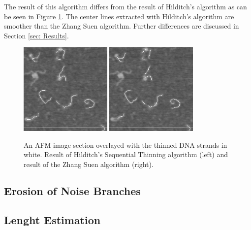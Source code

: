 \documentclass{article}
\begin{document}
The result of this algorithm differs from the result of Hilditch's algorithm as can be seen in Figure \ref{fig: thinnedHilditchZhang}. The center lines extracted with Hilditch's algorithm are smoother than the Zhang Suen algorithm. Further differences are discussed in Section \ref{sec: Results}.
\begin{figure}[htb!]
\centering
\includegraphics[width = 0.4\textwidth]{thinnedHilditch.png}
\includegraphics[width = 0.4\textwidth]{thinnedZhangSuen.png}
\caption{An AFM image section overlayed with the thinned DNA strands in white. Result of Hilditch's Sequential Thinning algorithm (left) and result of the Zhang Suen algorithm (right).}
\label{fig: thinnedHilditchZhang}
\end{figure}
\newpage
\subsection{Erosion of Noise Branches}\label{sec:Erosion of Noise Branches}
\subsection{Lenght Estimation}
\end{document}
